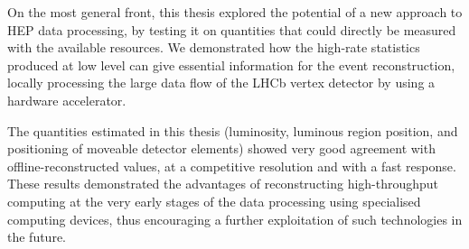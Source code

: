On the most general front, this thesis explored the potential of a new approach to HEP data processing, by testing it on quantities that could directly be measured with the available resources. We demonstrated how the high-rate statistics produced at low level can give essential information for the event reconstruction, locally processing the large data flow of the LHCb vertex detector by using a hardware accelerator. 

The quantities estimated in this thesis (luminosity, luminous region position, and positioning of moveable detector elements) showed very good agreement with offline-reconstructed values, at a competitive resolution and with a fast response. These results demonstrated the advantages of reconstructing high-throughput computing at the very early stages of the data processing using specialised computing devices, thus encouraging a further exploitation of such technologies in the future.


